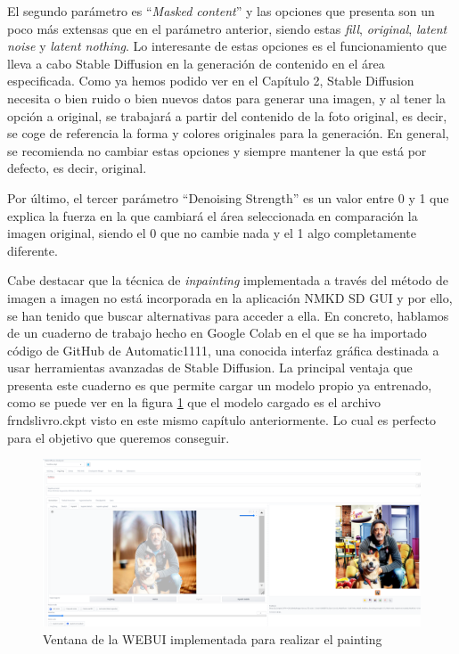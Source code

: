 El segundo parámetro es ``\textit{Masked content}'' y las opciones que presenta son un poco más extensas que en el parámetro anterior, siendo estas \textit{fill}, \textit{original}, \textit{latent noise} y \textit{latent nothing}. Lo interesante de estas opciones es el funcionamiento que lleva a cabo Stable Diffusion en la generación de contenido en el área especificada. Como ya hemos podido ver en el Capítulo 2, Stable Diffusion necesita o bien ruido o bien nuevos datos para generar una imagen, y al tener la opción a original, se trabajará a partir del contenido de la foto original, es decir, se coge de referencia la forma y colores originales para la generación. En general, se recomienda no cambiar estas opciones y siempre mantener la que está por defecto, es decir, original. 

Por último, el tercer parámetro ``Denoising Strength'' es un valor entre 0 y 1 que explica la fuerza en la que cambiará el área seleccionada en comparación la imagen original, siendo el 0 que no cambie nada y el 1 algo completamente diferente. 

Cabe destacar que la técnica de \textit{inpainting} implementada a través del método de imagen a imagen no está incorporada en la aplicación NMKD SD GUI y por ello, se han tenido que buscar alternativas para acceder a ella. En concreto, hablamos de un cuaderno de trabajo hecho en Google Colab en el que se ha importado código de GitHub de Automatic1111, una conocida interfaz gráfica destinada a usar herramientas avanzadas de Stable Diffusion. La principal ventaja que presenta este cuaderno es que permite cargar un modelo propio ya entrenado, como se puede ver en la figura \ref{fig:inpainting1} que el modelo cargado es el archivo frndslivro.ckpt visto en este mismo capítulo anteriormente. Lo cual es perfecto para el objetivo que queremos conseguir. 

\begin{figure}[h]
	\centering
	\includegraphics[width = 1
	\textwidth]{Imagenes/Vectorial/inpainting1.png}
	\caption{Ventana de la WEBUI implementada para realizar el painting}
	\label{fig:inpainting1}
\end{figure}

